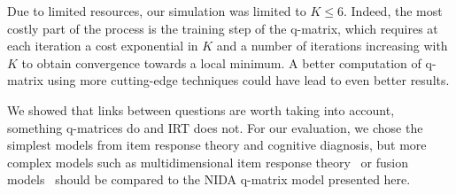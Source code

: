 \documentclass{sig-alternate}
\begin{document}


Due to limited resources, our simulation was limited to $K \leqslant 6$. Indeed, the most costly part of the process is the training step of the q-matrix, which requires at each iteration a cost exponential in $K$ and a number of iterations increasing with $K$ to obtain convergence towards a local minimum. A better computation of q-matrix using more cutting-edge techniques could have lead to even better results.







We showed that links between questions are worth taking into account, something q-matrices do and IRT does not. For our evaluation, we chose the simplest models from item response theory and cognitive diagnosis, but more complex models such as multidimensional item response theory~\citep{Desmarais2012} or fusion models~\citep{McGlohen2008} should be compared to the NIDA q-matrix model presented here.





\end{document}
